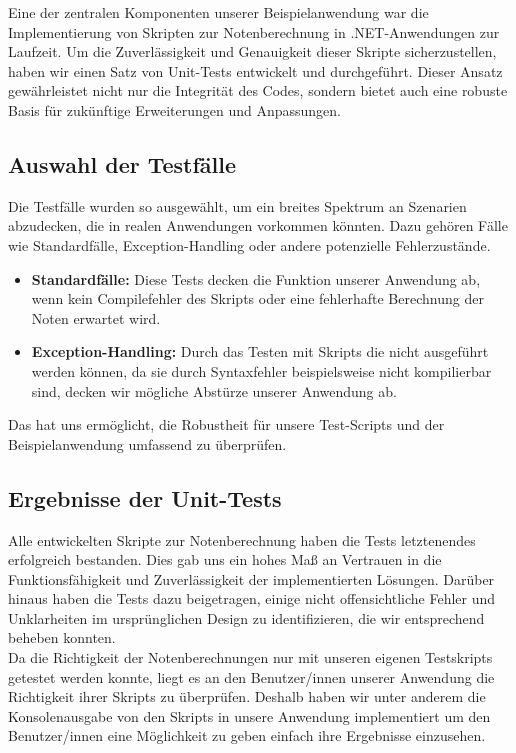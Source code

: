 Eine der zentralen Komponenten unserer Beispielanwendung war die Implementierung von 
Skripten zur Notenberechnung in .NET-Anwendungen zur Laufzeit. Um die Zuverlässigkeit und 
Genauigkeit dieser Skripte sicherzustellen, haben wir einen Satz von Unit-Tests entwickelt 
und durchgeführt. Dieser Ansatz gewährleistet nicht nur die Integrität des Codes, 
sondern bietet auch eine robuste Basis für zukünftige Erweiterungen und Anpassungen.

\subsection*{Auswahl der Testfälle}
Die Testfälle wurden so ausgewählt, um ein breites Spektrum an Szenarien abzudecken, 
die in realen Anwendungen vorkommen könnten. Dazu gehören Fälle wie Standardfälle, Exception-Handling
oder andere potenzielle Fehlerzustände. \\

\begin{itemize}
    \item \textbf{Standardfälle:} Diese Tests decken die Funktion unserer Anwendung ab, wenn kein 
    Compilefehler des Skripts oder eine fehlerhafte Berechnung der Noten erwartet wird.
    \item  \textbf{Exception-Handling:} Durch das Testen mit Skripts die nicht ausgeführt werden 
    können, da sie durch Syntaxfehler beispielsweise nicht kompilierbar sind, decken wir 
    mögliche Abstürze unserer Anwendung ab.
\end{itemize}

Das hat uns ermöglicht, die Robustheit für unsere Test-Scripts  
und der Beispielanwendung umfassend zu überprüfen.

\newpage

\subsection*{Ergebnisse der Unit-Tests}
Alle entwickelten Skripte zur Notenberechnung haben die Tests letztenendes erfolgreich bestanden. 
Dies gab uns ein hohes Maß an Vertrauen in die Funktionsfähigkeit und Zuverlässigkeit der 
implementierten Lösungen. Darüber hinaus haben die Tests dazu beigetragen, einige nicht 
offensichtliche Fehler und Unklarheiten im ursprünglichen Design zu identifizieren, 
die wir entsprechend beheben konnten.\\

Da die Richtigkeit der Notenberechnungen nur mit unseren eigenen Testskripts getestet werden konnte,
liegt es an den Benutzer/innen unserer Anwendung die Richtigkeit ihrer Skripts zu überprüfen. Deshalb 
haben wir unter anderem die Konsolenausgabe von den Skripts in unsere Anwendung implementiert um den
Benutzer/innen eine Möglichkeit zu geben einfach ihre Ergebnisse einzusehen.

